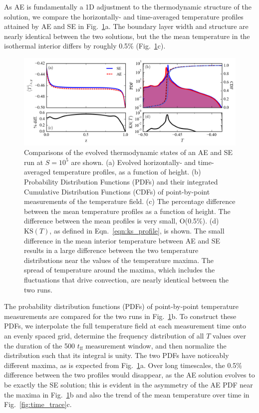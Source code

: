 \documentclass[aps, pre, onecolumn, nofootinbib, notitlepage, groupedaddress, amsfonts, amssymb, amsmath, longbibliography]{revtex4-1}
\newcommand{\KS}[1]{\ensuremath{\text{KS}(#1)}}
\begin{document}
As AE is fundamentally a 1D adjustment to the thermodynamic structure of the
solution, we compare the horizontally- and time-averaged temperature profiles 
attained by AE and SE in Fig.~\ref{fig:temp_comparison}a.  
The boundary layer width and structure are  
nearly identical between the two solutions, but the
the mean temperature in the isothermal interior differs by roughly 0.5\%
(Fig.~\ref{fig:temp_comparison}c). 

\begin{figure}[t!]
\includegraphics[width=\textwidth]{./figs/temp_comparison.png}
\caption{Comparisons of the evolved thermodynamic states of an AE and SE run
at $S = 10^{5}$ are shown.  (a) Evolved horizontally- and time-averaged 
temperature profiles, as a function of height.
(b) Probability Distribution Functions (PDFs) and their integrated
Cumulative Distribution Functions (CDFs)
of point-by-point measurements of the temperature field.
(c) The percentage difference between the mean temperature profiles as a function of height.
The difference between the mean profiles is very small, O(0.5\%).
(d) $\KS{T}$, as defined in Eqn.~\ref{eqn:ks_profile}, is shown. The small
difference in the mean interior temperature between AE and SE
results in a large difference between the two temperature distributions near the values
of the temperature maxima.  The spread of temperature around the maxima, which includes the 
fluctuations that drive convection, are nearly identical between the two runs.
\label{fig:temp_comparison} }
\end{figure}





The probability distribution functions (PDFs)
of point-by-point temperature measurements are compared for the two runs
in Fig.~\ref{fig:temp_comparison}b. To construct these PDFs, 
we interpolate the full temperature field
at each measurement time onto an evenly spaced grid, determine the
frequency distribution of all $T$ values over the duration of the 500 $t_{\text{ff}}$
measurement window, and then normalize the
distribution such that its integral is unity.  The two PDFs have noticeably
different maxima, as is expected from Fig.~\ref{fig:temp_comparison}a. 
Over long timescales, the 0.5\% difference between the two profiles would
disappear, as the AE solution evolves to be exactly the SE solution; this
is evident in the asymmetry of the AE PDF near the maxima
in Fig.~\ref{fig:temp_comparison}b and also
the trend of the mean temperature over time in Fig.~\ref{fig:time_trace}c.
\end{document}
